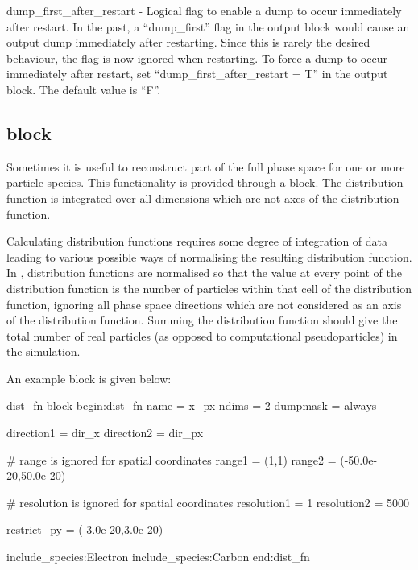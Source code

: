 {\emphtext dump\_first\_after\_restart} - Logical flag to enable a dump to
occur immediately after restart.
In the past, a ``dump\_first'' flag in the output block would cause
an output dump immediately after restarting. Since this is rarely
the desired behaviour, the flag is now ignored when restarting.
To force a dump to occur immediately after restart, set
``dump\_first\_after\_restart = T'' in the output block. The default value
is ``F''.


\subsection{\texorpdfstring
  { block}
  {           {dist\_fn} block}}
\label{sec:dist_fn_block}

Sometimes it is useful to reconstruct part of the
full phase space for one or more particle species.
This functionality is provided through a  block. The
distribution function is integrated over all dimensions which are not axes of
the distribution function.

Calculating distribution functions requires some degree of integration of data
leading to various possible ways of normalising the resulting distribution
function. In {\EPOCH}, distribution functions are normalised so that the value
at every point of the distribution function is the number of particles within
that cell of the distribution function, ignoring all phase space directions
which are not considered as an axis of the distribution function. Summing the
distribution function should give the total number of real particles
(as opposed to computational pseudoparticles) in the
simulation.

An example  block is given below:
{\samepage
\begin{lboxverbatim}{dist\_fn block}
begin:dist_fn
   name = x_px
   ndims = 2
   dumpmask = always

   direction1 = dir_x
   direction2 = dir_px

   # range is ignored for spatial coordinates
   range1 = (1,1)
   range2 = (-50.0e-20,50.0e-20)

   # resolution is ignored for spatial coordinates
   resolution1 = 1
   resolution2 = 5000

   restrict_py = (-3.0e-20,3.0e-20)

   include_species:Electron
   include_species:Carbon
end:dist_fn
\end{lboxverbatim}
}

